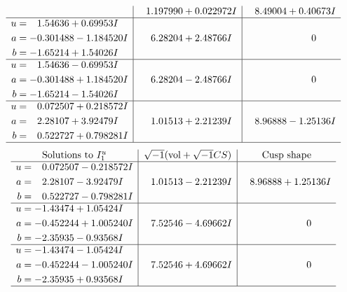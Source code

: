 \documentclass[1p]{elsarticle_modified}
\theoremstyle{definition}
\newcommand{\I}{\sqrt{-1}}
\begin{document}
$$\begin{array}{c|c|c}
 & \phantom{-}1.197990 + 0.022972 I & \phantom{-}8.49004 + 0.40673 I \\ \hline\begin{aligned}
u &= \phantom{-}1.54636 + 0.69953 I \\
a &= -0.301488 - 1.184520 I \\
b &= -1.65214 + 1.54026 I\end{aligned}
 & \phantom{-}6.28204 + 2.48766 I & \phantom{-0.000000 } 0 \\ \hline\begin{aligned}
u &= \phantom{-}1.54636 - 0.69953 I \\
a &= -0.301488 + 1.184520 I \\
b &= -1.65214 - 1.54026 I\end{aligned}
 & \phantom{-}6.28204 - 2.48766 I & \phantom{-0.000000 } 0 \\ \hline\begin{aligned}
u &= \phantom{-}0.072507 + 0.218572 I \\
a &= \phantom{-}2.28107 + 3.92479 I \\
b &= \phantom{-}0.522727 + 0.798281 I\end{aligned}
 & \phantom{-}1.01513 + 2.21239 I & \phantom{-}8.96888 - 1.25136 I\\
 \hline 
 \end{array}$$\newpage$$\begin{array}{c|c|c}  
\text{Solutions to }I^u_{1}& \I (\text{vol} + \sqrt{-1}CS) & \text{Cusp shape}\\
 \hline 
\begin{aligned}
u &= \phantom{-}0.072507 - 0.218572 I \\
a &= \phantom{-}2.28107 - 3.92479 I \\
b &= \phantom{-}0.522727 - 0.798281 I\end{aligned}
 & \phantom{-}1.01513 - 2.21239 I & \phantom{-}8.96888 + 1.25136 I \\ \hline\begin{aligned}
u &= -1.43474 + 1.05424 I \\
a &= -0.452244 + 1.005240 I \\
b &= -2.35935 - 0.93568 I\end{aligned}
 & \phantom{-}7.52546 - 4.69662 I & \phantom{-0.000000 } 0 \\ \hline\begin{aligned}
u &= -1.43474 - 1.05424 I \\
a &= -0.452244 - 1.005240 I \\
b &= -2.35935 + 0.93568 I\end{aligned}
 & \phantom{-}7.52546 + 4.69662 I & \phantom{-0.000000 } 0\\
 \hline 
 \end{array}$$\newpage\newpage\renewcommand{\arraystretch}{1}
\end{document}
